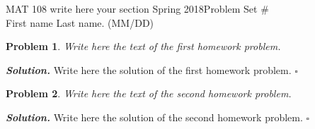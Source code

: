 \documentclass[12pt]{article}
\newtheorem{problem}{Problem}
\newenvironment{solution}[1][\it{Solution}]{\textbf{#1. } }{$\square$}
\begin{document}
\noindent MAT 108 write here your section Spring 2018\hfill Problem Set \#\\
First name Last name. (MM/DD)

\hrulefill


\begin{problem}
Write here the text of the first homework problem.
\end{problem}
\begin{solution}
	Write here the solution of the first homework problem.
\end{solution} 

\begin{problem}
Write here the text of the second homework problem.
\end{problem}
\begin{solution}
	Write here the solution of the second homework problem.
\end{solution}

 
\end{document}
